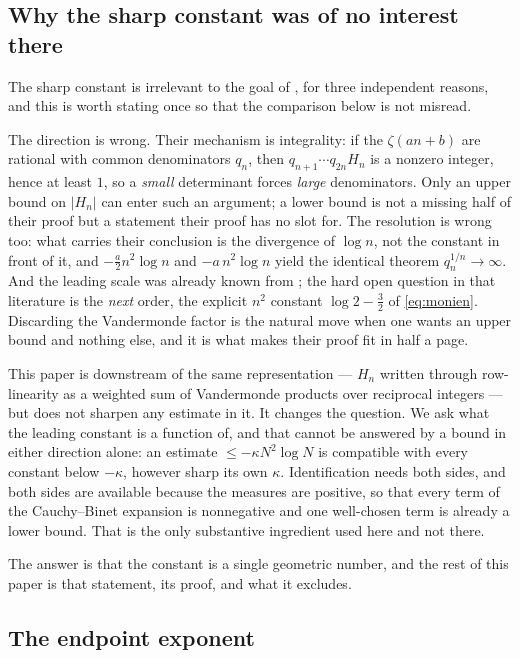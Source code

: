 \documentclass[11pt]{amsart}
\numberwithin{equation}{section}
\theoremstyle{plain}
\theoremstyle{definition}
\theoremstyle{remark}
\begin{document}
\subsection{Why the sharp constant was of no interest there}
\label{ss:whytwo}

The sharp constant is irrelevant to the goal of \cite{HaynesZudilin2015}, for three independent
reasons, and this is worth stating once so that the comparison below is not misread.

The direction is wrong. Their mechanism is integrality: if the $\zeta(an+b)$ are rational with
common denominators $q_{n}$, then $q_{n+1}\cdots q_{2n}H_{n}$ is a nonzero integer, hence at least
$1$, so a \emph{small} determinant forces \emph{large} denominators. Only an upper bound on
$|H_{n}|$ can enter such an argument; a lower bound is not a missing half of their proof but a
statement their proof has no slot for. The resolution is wrong too: what carries their conclusion is
the divergence of $\log n$, not the constant in front of it, and $-\tfrac a2n^{2}\log n$ and
$-a\,n^{2}\log n$ yield the identical theorem $q_{n}^{1/n}\to\infty$. And the leading scale was
already known from \cite{Monien2009}; the hard open question in that literature is the \emph{next}
order, the explicit $n^{2}$ constant $\log2-\tfrac32$ of \eqref{eq:monien}. Discarding the
Vandermonde factor is the natural move when one wants an upper bound and nothing else, and it is
what makes their proof fit in half a page.

This paper is downstream of the same representation --- $H_{n}$ written through row-linearity as a
weighted sum of Vandermonde products over reciprocal integers --- but does not sharpen any estimate
in it. It changes the question. We ask what the leading constant is a function of, and that cannot
be answered by a bound in either direction alone: an estimate $\le-\kappa N^{2}\log N$ is compatible
with every constant below $-\kappa$, however sharp its own $\kappa$. Identification needs both
sides, and both sides are available because the measures are positive, so that every term of the
Cauchy--Binet expansion is nonnegative and one well-chosen term is already a lower bound. That is
the only substantive ingredient used here and not there.

The answer is that the constant is a single geometric number, and the rest of this paper is that
statement, its proof, and what it excludes.

\subsection{The endpoint exponent}
\end{document}

